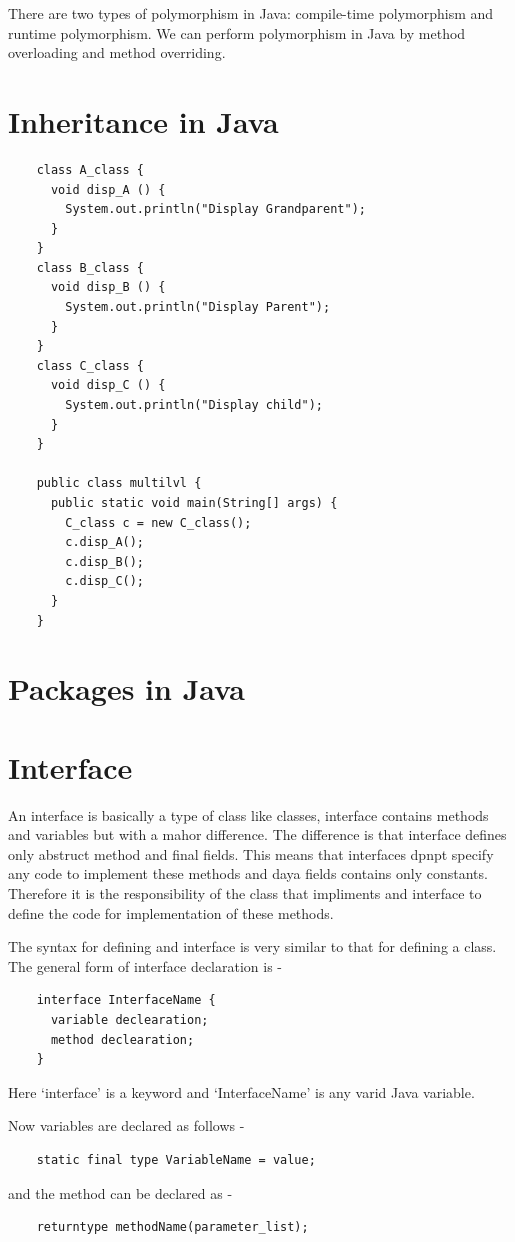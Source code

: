 \documentclass[11pt, a4paper]{book}
\begin{document}
  There are two types of polymorphism in Java: compile-time 
  polymorphism and runtime polymorphism. We can perform 
  polymorphism in Java by method overloading and method 
  overriding.

  \section{Inheritance in Java}
  \begin{lstlisting}
    class A_class {
      void disp_A () {
        System.out.println("Display Grandparent");
      }
    }
    class B_class {
      void disp_B () {
        System.out.println("Display Parent");
      }
    }
    class C_class {
      void disp_C () {
        System.out.println("Display child");
      }
    }
    
    public class multilvl {
      public static void main(String[] args) {
        C_class c = new C_class();
        c.disp_A();
        c.disp_B();
        c.disp_C();
      }
    }
  \end{lstlisting}
  \section{Packages in Java}

  \section{Interface}
  An interface is basically a type of class like classes, interface contains methods and variables
  but with a mahor difference. The difference is that interface defines only abstruct method and final fields. This means that interfaces dpnpt specify any code to implement these methods and daya fields contains only constants. Therefore it is the responsibility of the class that impliments and
  interface to define the code for implementation of these methods.

  The syntax for defining and interface is very similar to that for defining a class. The general form of interface declaration is -

  \begin{lstlisting}
    interface InterfaceName {
      variable declearation;
      method declearation;
    }
  \end{lstlisting}
  Here `interface' is a keyword and `InterfaceName' is any varid Java variable.

  Now variables are declared as follows - 
  \begin{lstlisting}
    static final type VariableName = value;
  \end{lstlisting}
  and the method can be declared as -
  \begin{lstlisting}
    returntype methodName(parameter_list);
  \end{lstlisting}
\end{document}
